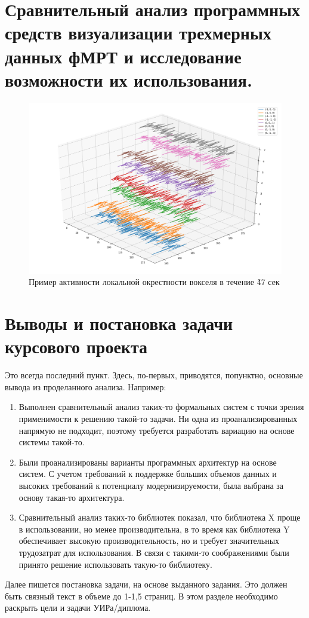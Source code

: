 \section{Сравнительный анализ программных средств визуализации трехмерных данных фМРТ и исследование возможности их использования.}

\begin{figure}%
	\begin{center}
		\includegraphics[width=.7\columnwidth]{./img/local_100c.png}%
	\end{center}
	\caption{Пример активности локальной окрестности вокселя в течение \~47 сек}%
	\label{pic:local_100c}%
\end{figure}




\section{Выводы и постановка задачи курсового проекта}

Это всегда последний пункт. Здесь, по-первых, приводятся, попунктно, основные вывода из проделанного анализа. Например:

\begin{enumerate}
	\item Выполнен сравнительный анализ таких-то формальных систем с точки зрения применимости к решению такой-то задачи. Ни одна из проанализированных напрямую не подходит, поэтому требуется разработать вариацию на основе системы такой-то.
	\item Были проанализированы варианты программных архитектур на основе систем. С учетом требований к поддержке больших объемов данных и высоких требований к потенциалу модернизируемости, была выбрана за основу такая-то архитектура.
	\item Сравнительный анализ таких-то библиотек показал, что библиотека X проще в использовании, но менее производительна, в то время как библиотека Y обеспечивает высокую производительность, но и требует значительных трудозатрат для использования. В связи с такими-то соображениями были принято решение использовать такую-то библиотеку.
\end{enumerate}

Далее пишется постановка задачи, на основе выданного задания. Это должен быть связный текст в объеме до 1-1,5 страниц. В этом разделе необходимо раскрыть цели и задачи УИРа/диплома.